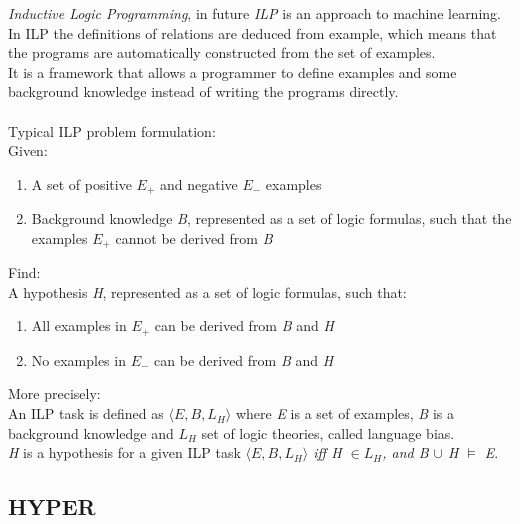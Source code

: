 \documentclass[11pt]{article}
\begin{document}
\emph{Inductive Logic Programming}, in future \emph{ILP} is an approach to machine learning.\\
In ILP the definitions of relations are deduced from example, which means that the programs are automatically constructed from the set of examples.\\
It is a framework that allows a programmer to define examples and some background knowledge instead of writing the programs directly.\\\\
Typical ILP problem formulation:\\Given:
\begin{enumerate}
\item A set of positive \emph{$E_+$} and negative \emph{$E_-$} examples
\item Background knowledge \emph{B}, represented as a set of logic formulas, such that the examples \emph{$E_+$} cannot be derived from \emph{B}
\end{enumerate}
Find:\\
A hypothesis \emph{H}, represented as a set of logic formulas, such that:
\begin{enumerate}
\item All examples in \emph{$E_+$} can be derived from \emph{B} and \emph{H}
\item No examples in \emph{$E_-$} can be derived from \emph{B} and \emph{H}
\end{enumerate}
More precisely:
\\
An ILP task is defined as \emph{$\langle E, B, L_H\rangle$} where \emph{E} is a set of examples, \emph{B} is a background knowledge and \emph{$L_H$} set of logic theories, called language bias.\\
\emph{H} is a hypothesis for a given ILP task \emph{$\langle E, B, L_H\rangle$ iff H $\in L_H$, and B $\cup$ H $\models$ E}. 

\subsection{HYPER}
\end{document}
